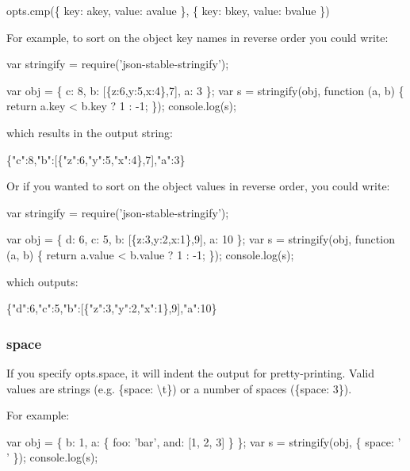 \begin{DoxyCode}
opts.cmp(\{ key: akey, value: avalue \}, \{ key: bkey, value: bvalue \})
\end{DoxyCode}


For example, to sort on the object key names in reverse order you could write\+:


\begin{DoxyCode}
var stringify = require('json-stable-stringify');

var obj = \{ c: 8, b: [\{z:6,y:5,x:4\},7], a: 3 \};
var s = stringify(obj, function (a, b) \{
    return a.key < b.key ? 1 : -1;
\});
console.log(s);
\end{DoxyCode}


which results in the output string\+:


\begin{DoxyCode}
\{"c":8,"b":[\{"z":6,"y":5,"x":4\},7],"a":3\}
\end{DoxyCode}


Or if you wanted to sort on the object values in reverse order, you could write\+:


\begin{DoxyCode}
var stringify = require('json-stable-stringify');

var obj = \{ d: 6, c: 5, b: [\{z:3,y:2,x:1\},9], a: 10 \};
var s = stringify(obj, function (a, b) \{
    return a.value < b.value ? 1 : -1;
\});
console.log(s);
\end{DoxyCode}


which outputs\+:


\begin{DoxyCode}
\{"d":6,"c":5,"b":[\{"z":3,"y":2,"x":1\},9],"a":10\}
\end{DoxyCode}


\subsubsection*{space}

If you specify {\ttfamily opts.\+space}, it will indent the output for pretty-\/printing. Valid values are strings (e.\+g. {\ttfamily \{space\+: \textbackslash{}t\}}) or a number of spaces ({\ttfamily \{space\+: 3\}}).

For example\+:


\begin{DoxyCode}
var obj = \{ b: 1, a: \{ foo: 'bar', and: [1, 2, 3] \} \};
var s = stringify(obj, \{ space: '  ' \});
console.log(s);
\end{DoxyCode}


